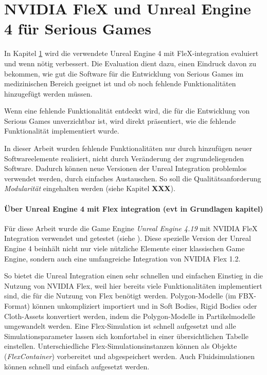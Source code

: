 
\chapter{NVIDIA FleX und Unreal Engine 4 für Serious Games}
\label{chap_Flex_Engine}

In Kapitel \ref{chap_Flex_Engine} wird die verwendete Unreal Engine 4 mit FleX-integration evaluiert und wenn nötig verbessert. Die Evaluation dient dazu, einen Eindruck davon zu bekommen, wie gut die Software für die Entwicklung von Serious Games im medizinischen Bereich geeignet ist und ob noch fehlende Funktionalitäten hinzugefügt werden müssen. 

Wenn eine fehlende Funktionalität entdeckt wird, die für die Entwicklung von Serious Games unverzichtbar ist, wird direkt präsentiert, wie die fehlende Funktionalität implementiert wurde.

In dieser Arbeit wurden fehlende Funktionalitäten nur durch hinzufügen neuer Softwareelemente realisiert, nicht durch Veränderung der zugrundeliegenden Software. Dadurch können neue Versionen der Unreal Integration problemlos verwendet werden, durch einfaches Austauschen. So soll die Qualitätsanforderung \textit{Modularität} eingehalten werden (siehe Kapitel \textbf{XXX}).

\subsubsection{Über Unreal Engine 4 mit Flex integration (evt in Grundlagen kapitel)}

Für diese Arbeit wurde die Game Engine \textit{Unreal Engine 4.19} mit NVIDIA FleX Integration verwendet und getestet (siehe \cite{UE4FlexDoc}). Diese spezielle Version der Unreal Engine 4 beinhält nicht nur viele nützliche Elemente einer klassischen Game Engine, sondern auch eine umfangreiche Integration von NVIDIA Flex 1.2. 

So bietet die Unreal Integration einen sehr schnellen und einfachen Einstieg in die Nutzung von NVIDIA Flex, weil hier bereits viele Funktionalitäten implementiert sind, die für die Nutzung von Flex benötigt werden. Polygon-Modelle (im FBX-Format) können unkompliziert importiert und in Soft Bodies, Rigid Bodies oder Cloth-Assets konvertiert werden, indem die Polygon-Modelle in Partikelmodelle umgewandelt werden. Eine Flex-Simulation ist schnell aufgesetzt und alle Simulationsparameter lassen sich komfortabel in einer übersichtlichen Tabelle einstellen. Unterschiedliche Flex-Simulationsinstanzen können als Objekte (\textit{FlexContainer}) vorbereitet und abgespeichert werden. Auch Fluidsimulationen können schnell und einfach aufgesetzt werden.

